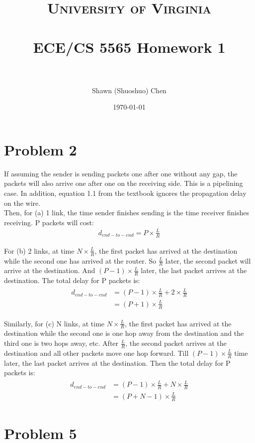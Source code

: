 \documentclass[paper=a4, fontsize=11pt]{scrartcl} %
\title{	
\normalfont \normalsize 
\textsc{University of Virginia} \\ [25pt] %
\horrule{0.5pt} \\[0.4cm] %
\huge ECE/CS 5565 Homework 1 \\ %
\horrule{2pt} \\[0.5cm] %
}
\author{Shawn (Shuoshuo) Chen} %
\date{\normalsize\today} %
\numberwithin{equation}{section} %
\numberwithin{figure}{section} %
\numberwithin{table}{section} %
\begin{document}
\maketitle %


\section{Problem 2}

If assuming the sender is sending packets one after one without any gap, the packets will also arrive one after one
on the receiving side. This is a pipelining case. In addition, equation 1.1 from the textbook ignores the propagation delay on the wire.
\\

Then, for (a) 1 link, the time sender finishes sending is the time receiver finishes receiving. P packets will cost:
\begin{align}
d_{end-to-end} = P \times \frac{L}{R}
\end{align}

For (b) 2 links, at time $N \times \frac{L}{R}$, the first packet has arrived at the destination while the second one has arrived at the router. So $\frac{L}{R}$ later, the second packet will arrive at the destination.
And $(P-1) \times \frac{L}{R}$ later, the last packet arrives at the destination. The total delay for P packets is:
\begin{align} 
\begin{split}
d_{end-to-end} &= (P-1) \times \frac{L}{R} + 2 \times \frac{L}{R} \\
&= (P+1) \times \frac{L}{R}
\end{split}					
\end{align}

Similarly, for (c) N links, at time $N \times \frac{L}{R}$, the first packet has arrived at the destination while the second one is one hop away from the destination and the third one is two hops away, etc. After $\frac{L}{R}$, 
the second packet arrives at the destination and all other packets move one hop forward.
Till $(P-1) \times \frac{L}{R}$ time later, the last packet arrives at the destination. Then the total delay for P packets is:
\begin{align} 
\begin{split}
d_{end-to-end} &= (P-1) \times \frac{L}{R} + N \times \frac{L}{R} \\
&= (P+N-1) \times \frac{L}{R}
\end{split}					
\end{align}




\section{Problem 5}
\end{document}
